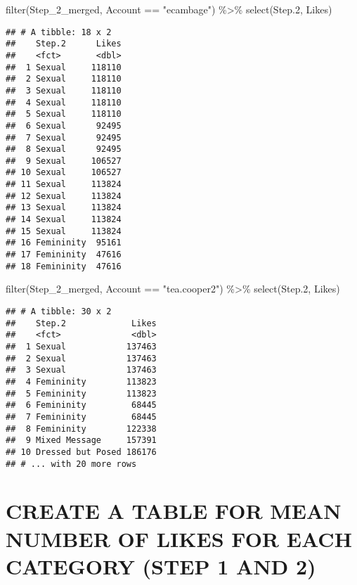 \documentclass[
]{article}
\newenvironment{Shaded}{\begin{snugshade}}{\end{snugshade}}
\newcommand{\FloatTok}[1]{\textcolor[rgb]{0.00,0.00,0.81}{#1}}
\newcommand{\FunctionTok}[1]{\textcolor[rgb]{0.00,0.00,0.00}{#1}}
\newcommand{\NormalTok}[1]{#1}
\newcommand{\SpecialCharTok}[1]{\textcolor[rgb]{0.00,0.00,0.00}{#1}}
\newcommand{\StringTok}[1]{\textcolor[rgb]{0.31,0.60,0.02}{#1}}
\begin{document}
\begin{Shaded}
\begin{Highlighting}[]
\FunctionTok{filter}\NormalTok{(Step\_2\_merged, Account }\SpecialCharTok{==} \StringTok{"ecambage"}\NormalTok{) }\SpecialCharTok{\%\textgreater{}\%}
  \FunctionTok{select}\NormalTok{(Step}\FloatTok{.2}\NormalTok{, Likes)}
\end{Highlighting}
\end{Shaded}

\begin{verbatim}
## # A tibble: 18 x 2
##    Step.2      Likes
##    <fct>       <dbl>
##  1 Sexual     118110
##  2 Sexual     118110
##  3 Sexual     118110
##  4 Sexual     118110
##  5 Sexual     118110
##  6 Sexual      92495
##  7 Sexual      92495
##  8 Sexual      92495
##  9 Sexual     106527
## 10 Sexual     106527
## 11 Sexual     113824
## 12 Sexual     113824
## 13 Sexual     113824
## 14 Sexual     113824
## 15 Sexual     113824
## 16 Femininity  95161
## 17 Femininity  47616
## 18 Femininity  47616
\end{verbatim}

\begin{Shaded}
\begin{Highlighting}[]
\FunctionTok{filter}\NormalTok{(Step\_2\_merged, Account }\SpecialCharTok{==} \StringTok{"tea.cooper2"}\NormalTok{) }\SpecialCharTok{\%\textgreater{}\%}
  \FunctionTok{select}\NormalTok{(Step}\FloatTok{.2}\NormalTok{, Likes)}
\end{Highlighting}
\end{Shaded}

\begin{verbatim}
## # A tibble: 30 x 2
##    Step.2             Likes
##    <fct>              <dbl>
##  1 Sexual            137463
##  2 Sexual            137463
##  3 Sexual            137463
##  4 Femininity        113823
##  5 Femininity        113823
##  6 Femininity         68445
##  7 Femininity         68445
##  8 Femininity        122338
##  9 Mixed Message     157391
## 10 Dressed but Posed 186176
## # ... with 20 more rows
\end{verbatim}

\hypertarget{create-a-table-for-mean-number-of-likes-for-each-category-step-1-and-2}{%
\section{CREATE A TABLE FOR MEAN NUMBER OF LIKES FOR EACH CATEGORY (STEP
1 AND
2)}\label{create-a-table-for-mean-number-of-likes-for-each-category-step-1-and-2}}
\end{document}
